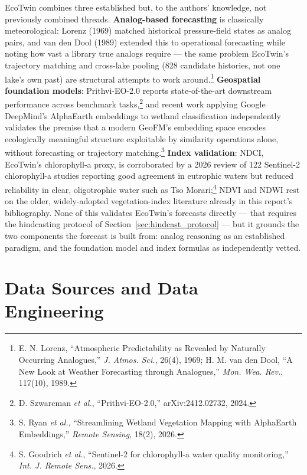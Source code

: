 \documentclass[12pt,a4paper,oneside]{report}
\begin{document}
EcoTwin combines three established but, to the authors' knowledge,
not previously combined threads. \textbf{Analog-based forecasting}
is classically meteorological: Lorenz (1969) matched historical
pressure-field states as analog pairs, and van den Dool (1989)
extended this to operational forecasting while noting how vast a
library true analogs require --- the same problem EcoTwin's
trajectory matching and cross-lake pooling (828 candidate histories,
not one lake's own past) are structural attempts to work
around.\footnote{E. N. Lorenz, ``Atmospheric Predictability as
Revealed by Naturally Occurring Analogues,'' \textit{J. Atmos.
Sci.}, 26(4), 1969; H. M. van den Dool, ``A New Look at Weather
Forecasting through Analogues,'' \textit{Mon. Wea. Rev.}, 117(10),
1989.} \textbf{Geospatial foundation models}: Prithvi-EO-2.0 reports
state-of-the-art downstream performance across benchmark
tasks,\footnote{D. Szwarcman \textit{et al.}, ``Prithvi-EO-2.0,''
arXiv:2412.02732, 2024.} and recent work applying Google DeepMind's
AlphaEarth embeddings to wetland classification independently
validates the premise that a modern GeoFM's embedding space encodes
ecologically meaningful structure exploitable by similarity
operations alone, without forecasting or trajectory
matching.\footnote{S. Ryan \textit{et al.}, ``Streamlining Wetland
Vegetation Mapping with AlphaEarth Embeddings,'' \textit{Remote
Sensing}, 18(2), 2026.} \textbf{Index validation}: NDCI, EcoTwin's
chlorophyll-a proxy, is corroborated by a 2026 review of 122
Sentinel-2 chlorophyll-a studies reporting good agreement in
eutrophic waters but reduced reliability in clear, oligotrophic
water such as Tso Morari;\footnote{S. Goodrich \textit{et al.},
``Sentinel-2 for chlorophyll-a water quality monitoring,''
\textit{Int. J. Remote Sens.}, 2026.} NDVI and NDWI rest on the
older, widely-adopted vegetation-index literature already in this
report's bibliography. None of this validates EcoTwin's forecasts
directly --- that requires the hindcasting protocol of
Section~\ref{sec:hindcast_protocol} --- but it grounds the two
components the forecast is built from: analog reasoning as an
established paradigm, and the foundation model and index formulas as
independently vetted.


\chapter{Data Sources and Data Engineering}
\label{chap:data}
\end{document}
